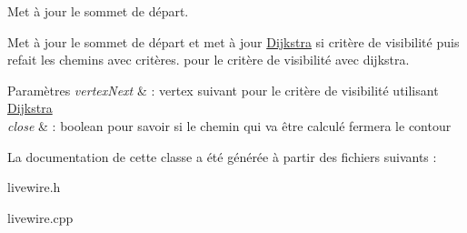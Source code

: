 Met à jour le sommet de départ. 

Met à jour le sommet de départ  et met à jour \hyperlink{classDijkstra}{Dijkstra} si critère de visibilité puis refait les chemins avec critères.  pour le critère de visibilité avec dijkstra.


\begin{DoxyParams}{Paramètres}
{\em vertex\+Next} & \+: vertex suivant pour le critère de visibilité utilisant \hyperlink{classDijkstra}{Dijkstra} \\
\hline
{\em close} & \+: boolean pour savoir si le chemin qui va être calculé fermera le contour \\
\hline
\end{DoxyParams}


La documentation de cette classe a été générée à partir des fichiers suivants \+:\begin{DoxyCompactItemize}
\item 
livewire.\+h\item 
livewire.\+cpp\end{DoxyCompactItemize}

